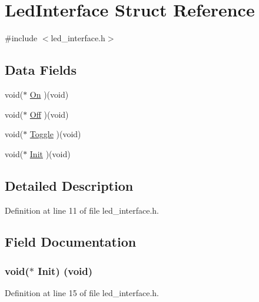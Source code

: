 \hypertarget{struct_led_interface}{}\section{Led\+Interface Struct Reference}
\label{struct_led_interface}


{\ttfamily \#include $<$led\+\_\+interface.\+h$>$}

\subsection*{Data Fields}
\begin{DoxyCompactItemize}
\item 
void($\ast$ \hyperlink{struct_led_interface_a53489a630b9ad16869554f434da8a204}{On} )(void)
\item 
void($\ast$ \hyperlink{struct_led_interface_a029a02aac2d90bfb8c8a526af9c6f806}{Off} )(void)
\item 
void($\ast$ \hyperlink{struct_led_interface_a2ab9d217f963a617589e790954897f07}{Toggle} )(void)
\item 
void($\ast$ \hyperlink{struct_led_interface_a070fbc6d31821b549069b5e0aa8a3358}{Init} )(void)
\end{DoxyCompactItemize}


\subsection{Detailed Description}


Definition at line 11 of file led\+\_\+interface.\+h.



\subsection{Field Documentation}
\subsubsection[{\texorpdfstring{Init}{Init}}]{\setlength{\rightskip}{0pt plus 5cm}void($\ast$ Init) (void)}\hypertarget{struct_led_interface_a070fbc6d31821b549069b5e0aa8a3358}{}\label{struct_led_interface_a070fbc6d31821b549069b5e0aa8a3358}


Definition at line 15 of file led\+\_\+interface.\+h.

